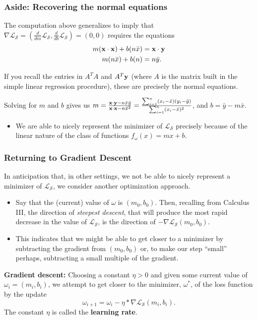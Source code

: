 \documentclass{beamer}
\theoremstyle{example}
\begin{document}
\begin{frame}
    \frametitle{Aside: Recovering the normal equations}
    The computation above generalizes to imply that $\nabla\mathcal L_{\mathcal S} = (\frac{d}{dm}\mathcal L_{\mathcal S}, \frac{d}{db}\mathcal L_{\mathcal S}) = (0,0)$ requires the equations 
        \begin{align*}
            m({\bf x}\cdot{\bf x}) + b(n\bar{x})    &= {\bf x}\cdot{\bf y} \\ 
            m(n\bar{x}) + b(n)                      &= n\bar{y}.
        \end{align*}
    
    \pause 
    If you recall the entries in $A^TA$ and $A^T{\bf y}$ (where $A$ is the matrix built in the simple linear regression procedure), these are precisely the normal equations.

    Solving for $m$ and $b$ gives us $m = \frac{{\bf x}\cdot{\bf y} - n\bar{x}\bar{y}}{{\bf x}\cdot{\bf x} - n\bar{x}^2} = \frac{\sum_{i=1}^n(x_i - \bar{x})(y_i - \bar{y})}{\sum_{i=1}^n(x_i - \bar{x})^2}$, and $b = \bar{y} - m\bar{x}$.

    \pause 
    \begin{itemize}
        \item We are able to nicely represent the minimizer of $\mathcal L_{\mathcal S}$ precisely because of the linear nature of the class of functions $f_{\omega}(x) = mx+b$.
    \end{itemize}
\end{frame}

\begin{frame}
    \frametitle{Returning to Gradient Descent}
    In anticipation that, in other settings, we not be able to nicely represent a minimizer of $\mathcal L_{\mathcal S}$, we consider another optimization approach. 

    \pause
    \begin{itemize}
        \item Say that the (current) value of $\omega$ is $(m_0, b_0)$. Then, recalling from Calculus III, the direction of \textit{steepest descent}, that will produce the most rapid decrease in the value of $\mathcal L_{\mathcal S}$, is the direction of $-\nabla\mathcal L_{\mathcal S}(m_0,b_0)$.
        \item This indicates that we might be able to get closer to a minimizer by subtracting the gradient from $(m_0,b_0)$ or, to make our step ``small'' perhaps, subtracting a small multiple of the gradient.
    \end{itemize}

    \pause
    \textbf{Gradient descent:} Choosing a constant $\eta > 0$ and given some current value of $\omega_i = (m_i,b_i)$, we attempt to get closer to the minimizer, $\omega^*$, of the loss function by the update 
        \[\omega_{i+1} = \omega_i - \eta\ast\nabla\mathcal L_{\mathcal S}(m_i,b_i).\]
    The constant $\eta$ is called the \textbf{learning rate}.
\end{frame}
\end{document}
